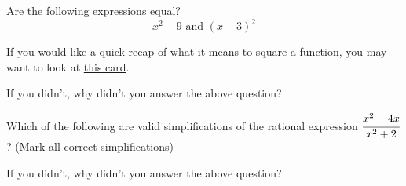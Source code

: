 \documentclass{ximera}
\begin{document}
\begin{problem} 
\begin{problem}
    Are the following expressions equal?
    $$x^2 - 9 \text{ and } (x-3)^2$$
    
    \begin{hint}
    If you would like a quick recap of what it means to square a function, you may want to look at \href{https://ximera.osu.edu/math160fa17/m160prerequisites/prerequisiteVideos/distribAndMultPolys}{this card}.
    \end{hint}
    
  \begin{multipleChoice}
      

        
  \end{multipleChoice}

\end{problem}

\begin{question}
  
    If you didn't, why didn't you answer the above question?
  
  \begin{multipleChoice}
      
      
  \end{multipleChoice}
\end{question}
\end{problem}

\begin{problem} 
\begin{problem}
    Which of the following are valid simplifications of the rational expression $\cfrac{x^2 - 4x}{x^2 + 2}$? (Mark all correct simplifications)
    

  \begin{selectAll}
      

  \end{selectAll}
\end{problem}
\begin{question}

    If you didn't, why didn't you answer the above question?
    
    \begin{multipleChoice}
      

    \end{multipleChoice}
\end{question}
\end{problem}
\end{document}
